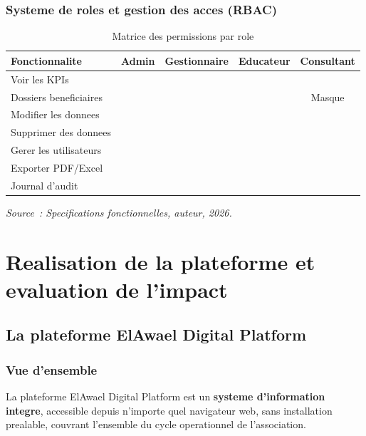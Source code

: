 \documentclass[12pt,a4paper,openany]{report}
\newcommand{\cmark}{\ding{51}}
\newcommand{\xmark}{\ding{55}}
\begin{document}
\section{Systeme de roles et gestion des acces (RBAC)}

\begin{table}[H]
\centering
\caption{Matrice des permissions par role}
\label{tab:rbac}
\begin{tabularx}{\textwidth}{Xcccc}
\toprule
\textbf{Fonctionnalite} & \textbf{Admin} & \textbf{Gestionnaire} & \textbf{Educateur} & \textbf{Consultant}\\
\midrule
Voir les KPIs & \cmark & \cmark & \cmark & \cmark\\
Dossiers beneficiaires & \cmark & \cmark & \cmark & Masque\\
Modifier les donnees & \cmark & \cmark & \cmark & \xmark\\
Supprimer des donnees & \cmark & \xmark & \xmark & \xmark\\
Gerer les utilisateurs & \cmark & \xmark & \xmark & \xmark\\
Exporter PDF/Excel & \cmark & \cmark & \xmark & \xmark\\
Journal d'audit & \cmark & \cmark & \xmark & \xmark\\
\bottomrule
\end{tabularx}
\vspace{0.1cm}
\small\textit{Source~: Specifications fonctionnelles, auteur, 2026.}
\end{table}

\part{Realisation de la plateforme et evaluation de l'impact}

\chapter{La plateforme ElAwael Digital Platform}

\section{Vue d'ensemble}

La plateforme ElAwael Digital Platform est un \textbf{systeme d'information
integre}, accessible depuis n'importe quel navigateur web, sans installation
prealable, couvrant l'ensemble du cycle operationnel de l'association.
\end{document}
